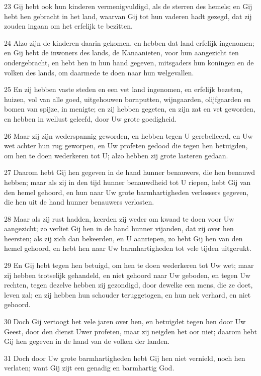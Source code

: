 \par 23 Gij hebt ook hun kinderen vermenigvuldigd, als de sterren des hemels; en Gij hebt hen gebracht in het land, waarvan Gij tot hun vaderen hadt gezegd, dat zij zouden ingaan om het erfelijk te bezitten.
\par 24 Alzo zijn de kinderen daarin gekomen, en hebben dat land erfelijk ingenomen; en Gij hebt de inwoners des lands, de Kanaanieten, voor hun aangezicht ten ondergebracht, en hebt hen in hun hand gegeven, mitsgaders hun koningen en de volken des lands, om daarmede te doen naar hun welgevallen.
\par 25 En zij hebben vaste steden en een vet land ingenomen, en erfelijk bezeten, huizen, vol van alle goed, uitgehouwen bornputten, wijngaarden, olijfgaarden en bomen van spijze, in menigte; en zij hebben gegeten, en zijn zat en vet geworden, en hebben in wellust geleefd, door Uw grote goedigheid.
\par 26 Maar zij zijn wederspannig geworden, en hebben tegen U gerebelleerd, en Uw wet achter hun rug geworpen, en Uw profeten gedood die tegen hen betuigden, om hen te doen wederkeren tot U; alzo hebben zij grote lasteren gedaan.
\par 27 Daarom hebt Gij hen gegeven in de hand hunner benauwers, die hen benauwd hebben; maar als zij in den tijd hunner benauwdheid tot U riepen, hebt Gij van den hemel gehoord, en hun naar Uw grote barmhartigheden verlossers gegeven, die hen uit de hand hunner benauwers verlosten.
\par 28 Maar als zij rust hadden, keerden zij weder om kwaad te doen voor Uw aangezicht; zo verliet Gij hen in de hand hunner vijanden, dat zij over hen heersten; als zij zich dan bekeerden, en U aanriepen, zo hebt Gij hen van den hemel gehoord, en hebt hen naar Uw barmhartigheden tot vele tijden uitgerukt.
\par 29 En Gij hebt tegen hen betuigd, om hen te doen wederkeren tot Uw wet; maar zij hebben trotselijk gehandeld, en niet gehoord naar Uw geboden, en tegen Uw rechten, tegen dezelve hebben zij gezondigd, door dewelke een mens, die ze doet, leven zal; en zij hebben hun schouder teruggetogen, en hun nek verhard, en niet gehoord.
\par 30 Doch Gij vertoogt het vele jaren over hen, en betuigdet tegen hen door Uw Geest, door den dienst Uwer profeten, maar zij neigden het oor niet; daarom hebt Gij hen gegeven in de hand van de volken der landen.
\par 31 Doch door Uw grote barmhartigheden hebt Gij hen niet vernield, noch hen verlaten; want Gij zijt een genadig en barmhartig God.
